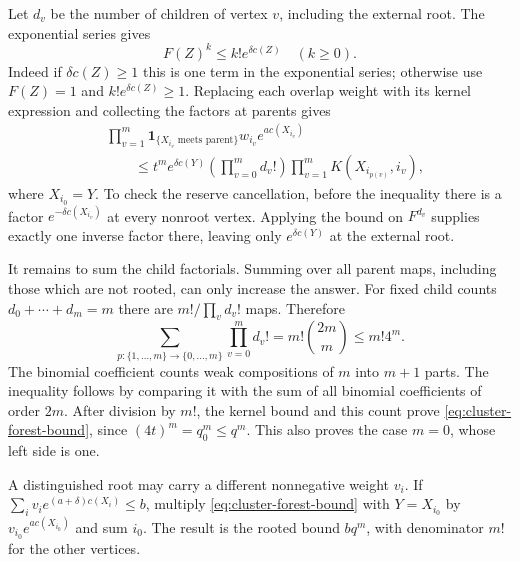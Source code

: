 Let $d_v$ be the number of children of vertex $v$, including the
external root. The exponential series gives
\[
                 F(Z)^k\le k!e^{\delta c(Z)}\quad(k\ge0).
\]
Indeed if $\delta c(Z)\ge1$ this is one term in the exponential
series; otherwise use $F(Z)=1$ and $k!e^{\delta c(Z)}\ge1$.
Replacing each overlap weight with its kernel expression and collecting
the factors at parents gives
\begin{align*}
 &\prod_{v=1}^m\mathbf1_{\{X_{i_v}\text{ meets parent}\}}
                    w_{i_v}e^{a c(X_{i_v})}\\
 &\qquad\le t^m e^{\delta c(Y)}
                    \left(\prod_{v=0}^m d_v!\right)
                    \prod_{v=1}^m K(X_{i_{p(v)}},i_v),
\end{align*}
where $X_{i_0}=Y$. To check the reserve cancellation, before the
inequality there is a factor $e^{-\delta c(X_{i_v})}$ at every
nonroot vertex. Applying the bound on $F^{d_v}$ supplies exactly
one inverse factor there, leaving only $e^{\delta c(Y)}$ at the
external root.

It remains to sum the child factorials. Summing over all parent maps,
including those which are not rooted, can only increase the answer.
For fixed child counts $d_0+\cdots+d_m=m$ there are
$m!/\prod_vd_v!$ maps. Therefore
\[
 \sum_{p:\{1,\ldots,m\}\to\{0,\ldots,m\}}\prod_{v=0}^m d_v!
       =m!\binom{2m}{m}\le m!4^m.
\]
The binomial coefficient counts weak compositions of $m$ into $m+1$
parts. The inequality follows by comparing it with the sum of all
binomial coefficients of order $2m$. After division by $m!$, the
kernel bound and this count prove
\eqref{eq:cluster-forest-bound}, since $(4t)^m=q_0^m\le q^m$.
This also proves the case $m=0$, whose left side is one.

A distinguished root may carry a different nonnegative weight $v_i$.
If $\sum_i v_i e^{(a+\delta)c(X_i)}\le b$, multiply
\eqref{eq:cluster-forest-bound} with $Y=X_{i_0}$ by
$v_{i_0}e^{a c(X_{i_0})}$ and sum $i_0$. The result is the rooted
bound $bq^m$, with denominator $m!$ for the other vertices.

